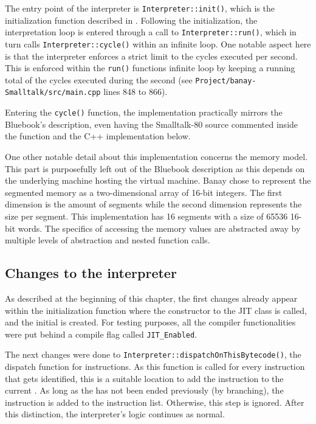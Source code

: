 The entry point of the interpreter is \texttt{Interpreter::init()}, which is the initialization function described in . Following the initialization, the interpretation loop is entered through a call to \texttt{Interpreter::run()}, which in turn calls \texttt{Interpreter::cycle()} within an infinite loop. One notable aspect here is that the interpreter enforces a strict limit to the cycles executed per second. This is enforced within the \texttt{run()} functions infinite loop by keeping a running total of the cycles executed during the second (see \texttt{Project/banay-Smalltalk/src/main.cpp} lines 848 to 866). 

Entering the \texttt{cycle()} function, the implementation practically mirrors the Bluebook's description, even having the Smalltalk-80 source commented inside the function and the C++ implementation below. 

One other notable detail about this implementation concerns the memory model. This part is purposefully left out of the Bluebook description as this depends on the underlying machine hosting the virtual machine. Banay chose to represent the segmented memory as a two-dimensional array of 16-bit integers. The first dimension is the amount of segments while the second dimension represents the size per segment. This implementation has 16 segments with a size of 65536 16-bit words. The specifics of accessing the memory values are abstracted away by multiple levels of abstraction and nested function calls. 

\subsection{Changes to the interpreter}
As described at the beginning of this chapter, the first changes already appear within the initialization function where the constructor to the JIT class is called, and the initial \bb{} is created. For testing purposes, all the \jit{} compiler functionalities were put behind a compile flag called \texttt{JIT\_Enabled}. 

The next changes were done to \texttt{Interpreter::dispatchOnThisBytecode()}, the dispatch function for instructions. As this function is called for every instruction that gets identified, this is a suitable location to add the instruction to the current \bb{}. As long as the \bb{} has not been ended previously (by branching), the instruction is added to the \bbs{} instruction list. Otherwise, this step is ignored. After this distinction, the interpreter's logic continues as normal. 


